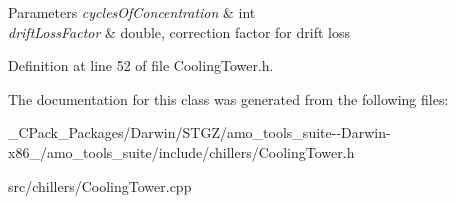 \begin{DoxyParams}{Parameters}
{\em cycles\+Of\+Concentration} & int \\
\hline
{\em drift\+Loss\+Factor} & double, correction factor for drift loss \\
\hline
\end{DoxyParams}


Definition at line 52 of file Cooling\+Tower.\+h.



The documentation for this class was generated from the following files\+:\begin{DoxyCompactItemize}
\item 
\+\_\+\+C\+Pack\+\_\+\+Packages/\+Darwin/\+S\+T\+G\+Z/amo\+\_\+tools\+\_\+suite-\/-\/\+Darwin-\/x86\+\_/amo\+\_\+tools\+\_\+suite/include/chillers/Cooling\+Tower.\+h\item 
src/chillers/Cooling\+Tower.\+cpp\end{DoxyCompactItemize}
